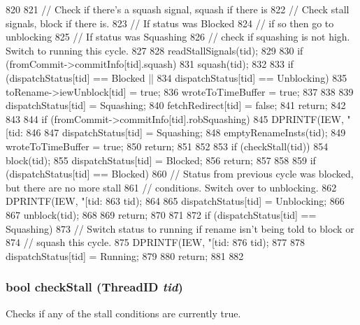 \begin{DoxyCode}
820 {
821     // Check if there's a squash signal, squash if there is
822     // Check stall signals, block if there is.
823     // If status was Blocked
824     //     if so then go to unblocking
825     // If status was Squashing
826     //     check if squashing is not high.  Switch to running this cycle.
827 
828     readStallSignals(tid);
829 
830     if (fromCommit->commitInfo[tid].squash) {
831         squash(tid);
832 
833         if (dispatchStatus[tid] == Blocked ||
834             dispatchStatus[tid] == Unblocking) {
835             toRename->iewUnblock[tid] = true;
836             wroteToTimeBuffer = true;
837         }
838 
839         dispatchStatus[tid] = Squashing;
840         fetchRedirect[tid] = false;
841         return;
842     }
843 
844     if (fromCommit->commitInfo[tid].robSquashing) {
845         DPRINTF(IEW, "[tid:%
846 
847         dispatchStatus[tid] = Squashing;
848         emptyRenameInsts(tid);
849         wroteToTimeBuffer = true;
850         return;
851     }
852 
853     if (checkStall(tid)) {
854         block(tid);
855         dispatchStatus[tid] = Blocked;
856         return;
857     }
858 
859     if (dispatchStatus[tid] == Blocked) {
860         // Status from previous cycle was blocked, but there are no more stall
861         // conditions.  Switch over to unblocking.
862         DPRINTF(IEW, "[tid:%
863                 tid);
864 
865         dispatchStatus[tid] = Unblocking;
866 
867         unblock(tid);
868 
869         return;
870     }
871 
872     if (dispatchStatus[tid] == Squashing) {
873         // Switch status to running if rename isn't being told to block or
874         // squash this cycle.
875         DPRINTF(IEW, "[tid:%
876                 tid);
877 
878         dispatchStatus[tid] = Running;
879 
880         return;
881     }
882 }
\end{DoxyCode}
\hypertarget{classDefaultIEW_a2dd2400250619a315cb46f95f777db01}{
\subsubsection[{checkStall}]{\setlength{\rightskip}{0pt plus 5cm}bool checkStall ({\bf ThreadID} {\em tid})}}
\label{classDefaultIEW_a2dd2400250619a315cb46f95f777db01}
Checks if any of the stall conditions are currently true. 


